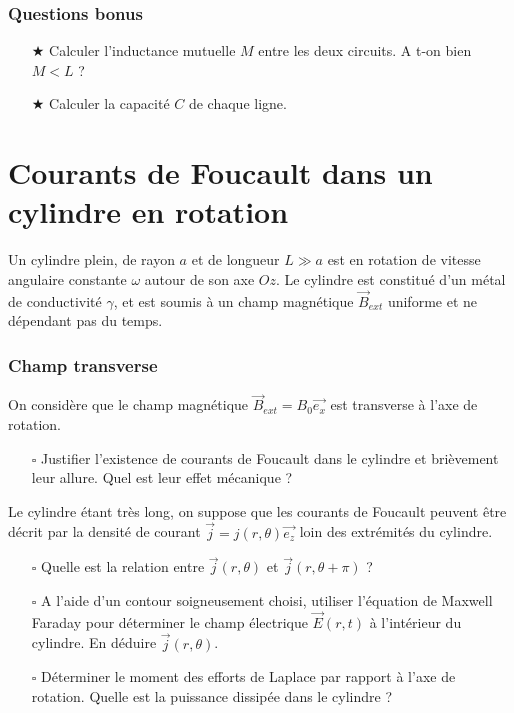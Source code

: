 \documentclass{report}
\begin{document}
\subsubsection*{Questions bonus}

\begin{itemize}
		
	\item[$\bigstar$] Calculer l'inductance mutuelle $M$ entre les deux circuits. A t-on bien $M<L$ ? 
	
	\item[$\bigstar$] Calculer la capacité $C$ de chaque ligne. 
	
\end{itemize}

\newpage

\section*{Courants de Foucault dans un cylindre en rotation}

Un cylindre plein, de rayon $a$ et de longueur $L\gg a$ est en rotation de vitesse angulaire constante $\omega$ autour de son axe $Oz$. Le cylindre est constitué d'un métal de conductivité $\gamma$, et est soumis à un champ magnétique $\vec{B}_{ext}$ uniforme et ne dépendant pas du temps.
	
\subsubsection*{Champ transverse}	
	
	On considère que le champ magnétique $\vec{B}_{ext}=B_{0}\vec{e_{x}}$ est transverse à l'axe de rotation. 
	
\begin{itemize}

	\item[$\square$] Justifier l'existence de courants de Foucault dans le cylindre et brièvement leur allure. Quel est leur effet mécanique ?
	
\end{itemize}
	
	Le cylindre étant très long, on suppose que les courants de Foucault peuvent être décrit par la densité de courant $\vec{j}=j(r,\theta)\vec{e_{z}}$ loin des extrémités du cylindre.
	
\begin{itemize}

		\item[$\square$] Quelle est la relation entre $\vec{j}(r,\theta)$ et $\vec{j}(r,\theta+\pi)$ ?
		
		\item[$\square$] A l'aide d'un contour soigneusement choisi, utiliser l'équation de Maxwell Faraday pour déterminer le champ électrique $\vec{E}(r,t)$ à l'intérieur du cylindre. En déduire $\vec{j}(r,\theta)$.
		
		\item[$\square$] Déterminer le moment des efforts de Laplace par rapport à l'axe de rotation. Quelle est la puissance dissipée dans le cylindre ?
								
\end{itemize}
\end{document}

